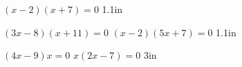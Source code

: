 {
    \centering
    $(x-2)(x+7) = 0$
}
{1.1in}

\myProblems
{
    \centering
    $(3x-8)(x+11) = 0$
}
{
    \centering
    $(x-2)(5x+7) = 0$
}
{1.1in}


\myProblems
{
    $(4x-9)x = 0$  
}
{
    $x(2x-7) = 0$
}
{3in}

